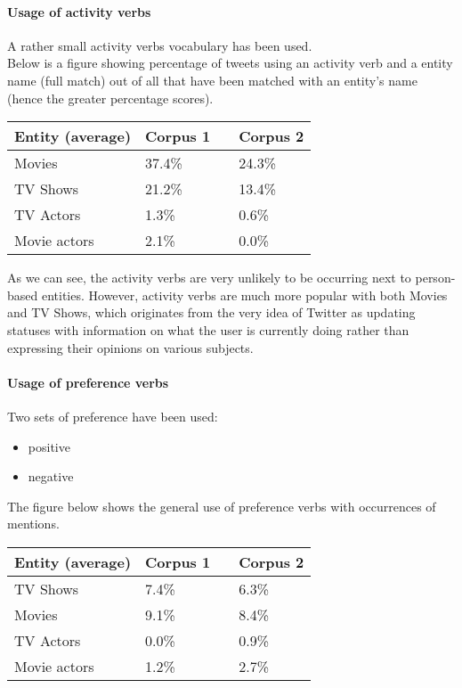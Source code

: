\paragraph{Usage of activity verbs}
A rather small activity verbs vocabulary has been used.
\\ Below is a figure showing percentage of tweets using an activity verb
and a entity name (full match) out of all that have been matched with an
entity's name (hence the greater percentage scores).

\begin{center}
  \begin{tabular}{ | p{4cm} | p{2cm} | p{1cm}| p{2cm} | } \hline
    Entity (average) & Corpus 1 & & Corpus 2 \\ \hline
    Movies & 37.4\% & & 24.3\% \\ \hline
    TV Shows & 21.2\% & & 13.4\% \\ \hline
    TV Actors & 1.3\% & & 0.6\% \\ \hline
    Movie actors & 2.1\% & & 0.0\% \\ \hline
  \end{tabular}
\end{center}

As we can see, the activity verbs are very unlikely to be occurring next to
person-based entities. However, activity verbs are much more popular with both
Movies and TV Shows, which originates from the very idea of Twitter as
updating statuses with information on what the user is currently doing rather
than expressing their opinions on various subjects.

\paragraph{Usage of preference verbs}
Two sets of preference have been used:
\begin{itemize}
\item positive
\item negative
\end{itemize}

The figure below shows the general use of preference verbs with occurrences of
mentions.

\begin{center}
  \begin{tabular}{ | p{4cm} | p{2cm} | p{1cm}| p{2cm} | } \hline
    Entity (average) & Corpus 1 & & Corpus 2 \\ \hline
    TV Shows & 7.4\% & & 6.3\% \\ \hline
    Movies & 9.1\% & & 8.4\% \\ \hline
    TV Actors & 0.0\% & & 0.9\% \\ \hline
    Movie actors & 1.2\% & & 2.7\% \\ \hline
  \end{tabular}
\end{center}

